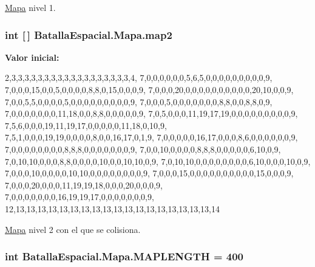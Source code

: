 \hyperlink{classBatallaEspacial_1_1Mapa}{Mapa} nivel 1. \hypertarget{classBatallaEspacial_1_1Mapa_ac91674c5133d9fbb26040b88e49d41c2}{
\subsubsection[{map2}]{\setlength{\rightskip}{0pt plus 5cm}int \mbox{[}$\,$\mbox{]} {\bf BatallaEspacial.Mapa.map2}}}
\label{classBatallaEspacial_1_1Mapa_ac91674c5133d9fbb26040b88e49d41c2}
{\bfseries Valor inicial:}
\begin{DoxyCode}
 {  
            2,3,3,3,3,3,3,3,3,3,3,3,3,3,3,3,3,3,3,4,
            7,0,0,0,0,0,0,5,6,5,0,0,0,0,0,0,0,0,0,9,
            7,0,0,0,15,0,0,5,0,0,0,0,8,8,0,15,0,0,0,9,
            7,0,0,0,20,0,0,0,0,0,0,0,0,0,0,20,10,0,0,9,
            7,0,0,5,5,0,0,0,0,5,0,0,0,0,0,0,0,0,0,9,
            7,0,0,0,5,0,0,0,0,0,0,0,8,8,0,0,8,8,0,9,
            7,0,0,0,0,0,0,0,11,18,0,0,8,8,0,0,0,0,0,9,
            7,0,5,0,0,0,11,19,17,19,0,0,0,0,0,0,0,0,0,9,
            7,5,6,0,0,0,19,11,19,17,0,0,0,0,0,11,18,0,10,9,
            7,5,1,0,0,0,19,19,0,0,0,0,8,0,0,16,17,0,1,9,
            7,0,0,0,0,0,16,17,0,0,0,8,6,0,0,0,0,0,0,9,
            7,0,0,0,0,0,0,0,0,8,8,8,0,0,0,0,0,0,0,9,
            7,0,0,10,0,0,0,0,8,8,8,0,0,0,0,0,6,10,0,9,
            7,0,10,10,0,0,0,8,8,0,0,0,0,10,0,0,10,10,0,9,
            7,0,10,10,0,0,0,0,0,0,0,0,6,10,0,0,0,10,0,9,
            7,0,0,0,10,0,0,0,0,10,10,0,0,0,0,0,0,0,0,9,
            7,0,0,0,15,0,0,0,0,0,0,0,0,0,0,15,0,0,0,9,
            7,0,0,0,20,0,0,0,11,19,19,18,0,0,0,20,0,0,0,9,
            7,0,0,0,0,0,0,0,16,19,19,17,0,0,0,0,0,0,0,9,
            12,13,13,13,13,13,13,13,13,13,13,13,13,13,13,13,13,13,13,14
        }
\end{DoxyCode}
\hyperlink{classBatallaEspacial_1_1Mapa}{Mapa} nivel 2 con el que se colisiona. \hypertarget{classBatallaEspacial_1_1Mapa_ab3fe55574e94cce2eec78c8ae16f7e6f}{
\subsubsection[{MAPLENGTH}]{\setlength{\rightskip}{0pt plus 5cm}int {\bf BatallaEspacial.Mapa.MAPLENGTH} = 400}}
